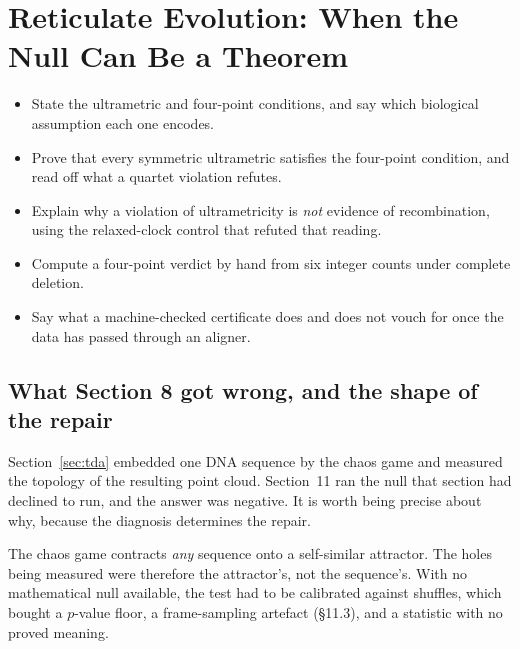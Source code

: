 \section{Reticulate Evolution: When the Null Can Be a Theorem}\label{sec:reticulata}

\begin{objectives}
\begin{itemize}[leftmargin=*,itemsep=1pt,topsep=1pt]
  \item State the ultrametric and four-point conditions, and say which biological assumption each one encodes.
  \item Prove that every symmetric ultrametric satisfies the four-point condition, and read off what a quartet violation refutes.
  \item Explain why a violation of ultrametricity is \emph{not} evidence of recombination, using the relaxed-clock control that refuted that reading.
  \item Compute a four-point verdict by hand from six integer counts under complete deletion.
  \item Say what a machine-checked certificate does and does not vouch for once the data has passed through an aligner.
\end{itemize}
\end{objectives}

\subsection{What Section 8 got wrong, and the shape of the repair}

Section~\ref{sec:tda} embedded one DNA sequence by the chaos game and measured
the topology of the resulting point cloud. Section~11 ran the null that section
had declined to run, and the answer was negative. It is worth being precise
about why, because the diagnosis determines the repair.

The chaos game contracts \emph{any} sequence onto a self-similar attractor. The
holes being measured were therefore the attractor's, not the sequence's. With no
mathematical null available, the test had to be calibrated against shuffles,
which bought a $p$-value floor, a frame-sampling artefact (\S11.3), and a
statistic with no proved meaning.

